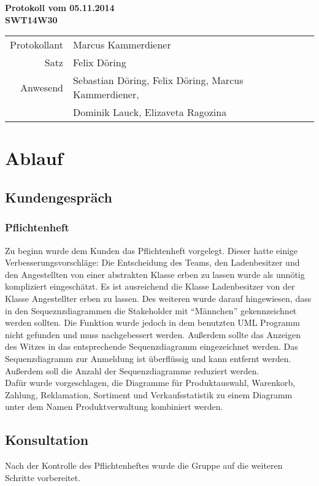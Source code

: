 \documentclass{scrartcl}
\begin{document}
\begin{center}
\LARGE \bf{Protokoll vom 05.11.2014 \\
SWT14W30}
\end{center}

\begin{tabular}{rp{10cm}}
Protokollant & Marcus Kammerdiener \\
Satz & Felix Döring \\
Anwesend & Sebastian Döring, Felix Döring, Marcus Kammerdiener,\\
& Dominik Lauck, Elizaveta Ragozina \\
\end{tabular}

\vspace*{3em}

\section{Ablauf}
\subsection{Kundengespr\"ach}
\subsubsection{Pflichtenheft}
Zu beginn wurde dem Kunden das Pflichtenheft vorgelegt. Dieser hatte einige Verbesserungsvorschläge: Die Entscheidung des Teams, den Ladenbesitzer und den Angestellten von einer abstrakten Klasse erben zu lassen wurde als unn\"otig kompliziert eingeschätzt. Es ist ausreichend die Klasse Ladenbesitzer von der Klasse Angestellter erben zu lassen. Des weiteren wurde darauf hingewiesen, dass in den Sequeznzdiagrammen die Stakeholder mit "`M\"annchen"' gekennzeichnet werden sollten. Die Funktion wurde jedoch in dem benutzten UML Programm nicht gefunden und muss nachgebessert werden. Außerdem sollte das Anzeigen des Witzes in das entsprechende Sequenzdiagramm eingezeichnet werden. Das Sequenzdiagramm zur Anmeldung ist \"uberflüssig und kann entfernt werden. Außerdem soll die Anzahl der Sequenzdiagramme reduziert werden.\\
Daf\"ur wurde vorgeschlagen, die Diagramme für Produktauswahl, Warenkorb, Zahlung, Reklamation, Sortiment und Verkaufsstatistik zu einem Diagramm unter dem Namen Produktverwaltung kombiniert werden.
\subsection{Konsultation}
Nach der Kontrolle des Pflichtenheftes wurde die Gruppe auf die weiteren Schritte vorbereitet.
\end{document}

